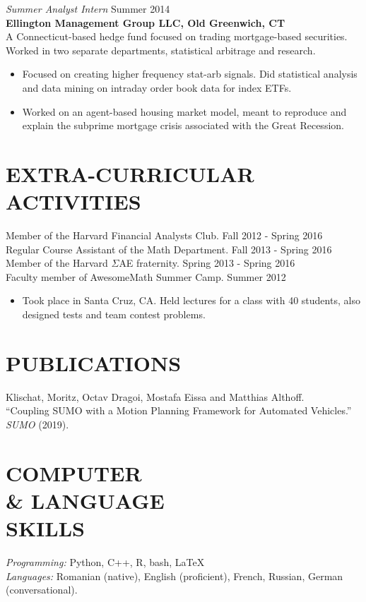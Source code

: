 \documentclass[margin]{res}
\begin{document}
\begin{resume}
  {\sl Summer Analyst Intern} \hfill Summer 2014 \\
  \textbf{Ellington Management Group LLC, Old Greenwich, CT} \\
  A Connecticut-based hedge fund focused on trading mortgage-based securities.
  Worked in two separate departments, statistical arbitrage and research.
  \begin{itemize} \itemsep -2pt
    \item Focused on creating higher frequency stat-arb signals.
      Did statistical analysis and data mining on intraday order book data for index ETFs.
    \item Worked on an agent-based housing market model, meant to reproduce and explain the
      subprime mortgage crisis associated with the Great Recession.
  \end{itemize}

  \section{EXTRA-CURRICULAR \\ ACTIVITIES} Member of the Harvard Financial Analysts Club.
    \hfill Fall 2012 - Spring 2016 \\
  Regular Course Assistant of the Math Department. \hfill Fall 2013 - Spring 2016 \\
  Member of the Harvard $\Sigma$AE fraternity. \hfill Spring 2013 - Spring 2016 \\
  Faculty member of AwesomeMath Summer Camp. \hfill Summer 2012
  \begin{itemize} \itemsep -2pt
    \item Took place in Santa Cruz, CA. Held lectures for a class with 40 students,
      also designed tests and team contest problems. \\
  \end{itemize}

  \section{PUBLICATIONS} 
  Klischat, Moritz, Octav Dragoi, Mostafa Eissa and Matthias Althoff. \\
  “Coupling SUMO with a Motion Planning Framework for Automated Vehicles.” \\
  \textit{SUMO} (2019).

  \section{COMPUTER \\ \& LANGUAGE \\ SKILLS} {\sl Programming:\/} Python, C++, R, bash, \LaTeX  \\
  {\sl Languages:\/} Romanian (native), English (proficient), French, Russian, German (conversational).

\end{resume}
\end{document}
